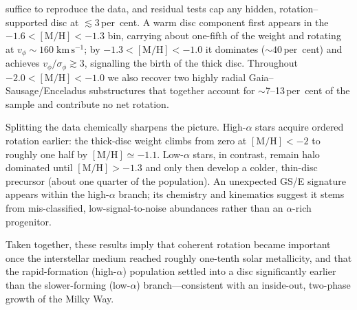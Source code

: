 \documentclass[a4paper,10pt]{article}
\begin{document}
\begin{multicols}{2}
suffice to reproduce the data, and residual tests 
cap any hidden, rotation–supported disc at $\lesssim3$\,per~cent.  A warm disc component first appears 
in the $-1.6<\mathrm{[M/H]}<-1.3$ bin, carrying about one-fifth of the weight and rotating at 
$v_{\phi}\!\sim\!160\;\mathrm{km\,s^{-1}}$; by $-1.3<\mathrm{[M/H]}<-1.0$ it dominates 
($\sim40$\,per~cent) and achieves $v_{\phi}/\sigma_{\phi}\!\gtrsim\!3$, signalling the 
birth of the thick disc.  Throughout $-2.0<\mathrm{[M/H]}<-1.0$ we also recover two highly 
radial Gaia–Sausage/Enceladus substructures that together account for $\sim$7–13\,per~cent 
of the sample and contribute no net rotation.

Splitting the data chemically sharpens the picture.  High-$\alpha$ stars acquire ordered rotation earlier: the thick-disc weight climbs from zero at $\mathrm{[M/H]}<-2$ to roughly one half by $\mathrm{[M/H]}\simeq-1.1$.  Low-$\alpha$ stars, in contrast, remain halo dominated until $\mathrm{[M/H]}>-1.3$ and only then develop a colder, thin-disc precursor (about one quarter of the population).  An unexpected GS/E signature appears within the high-$\alpha$ branch; its chemistry and kinematics suggest it stems from mis-classified, low-signal-to-noise abundances rather than an $\alpha$-rich progenitor.

Taken together, these results imply that coherent rotation became important once the interstellar medium reached roughly one-tenth solar metallicity, and that the rapid-formation (high-$\alpha$) population settled into a disc significantly earlier than the slower-forming (low-$\alpha$) branch—consistent with an inside-out, two-phase growth of the Milky Way.






\end{multicols}
\end{document}
